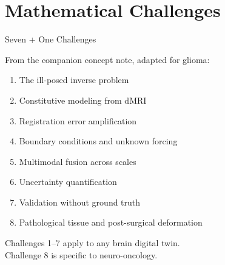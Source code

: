 
\section{Mathematical Challenges}

\begin{frame}{Seven + One Challenges}

  From the companion concept note, adapted for glioma:

  \bigskip

  \begin{enumerate}
    \item The ill-posed inverse problem
    \item Constitutive modeling from dMRI
    \item Registration error amplification
    \item Boundary conditions and unknown forcing
    \item Multimodal fusion across scales
    \item Uncertainty quantification
    \item Validation without ground truth
    \item[\alert{8.}] \alert{Pathological tissue and post-surgical
      deformation}
  \end{enumerate}

  \bigskip

  Challenges 1--7 apply to any brain digital twin.\\
  Challenge 8 is specific to neuro-oncology.

\end{frame}

